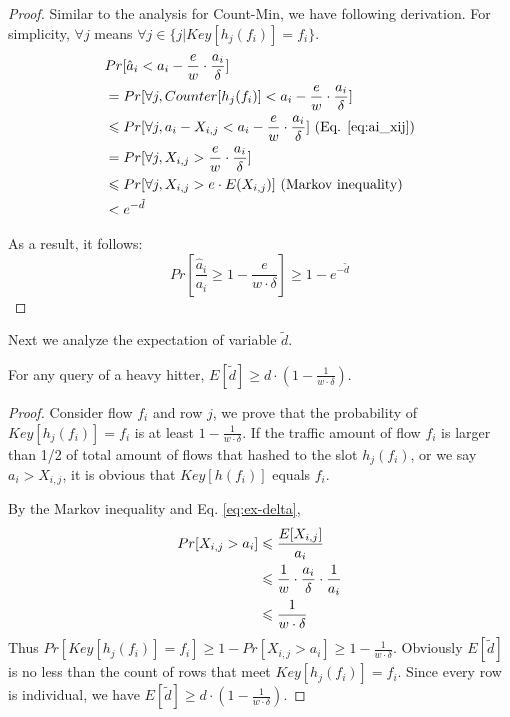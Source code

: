 \begin{proof}
	
Similar to the analysis for Count-Min\cite{cormode2004improved}, we have following derivation. For simplicity, $\forall j$ means $\forall j\in \{j|Key[h_j(f_i)] = f_i\}$.
\begin{align}\notag
&Pr[\hat{a}_i< a_i-\frac{e}{w}\cdot\frac{a_i}{\delta}]\\\notag
&=Pr[\forall j, Counter[h_j(f_i)]<a_i-\frac{e}{w}\cdot\frac{a_i}{\delta} ]\\\notag
&\le Pr[\forall j, a_i-X_{i,j} <a_i-\frac{e}{w}\cdot\frac{a_i}{\delta} ] \text{ (Eq. \eqref{eq:ai_xij})}\\\notag
&=Pr[\forall j, X_{i,j} > \frac{e}{w}\cdot\frac{a_i}{\delta} ]\\\notag
&\le Pr[\forall j, X_{i,j}>e\cdot E(X_{i,j})]\text{ (Markov inequality)}\\\notag
&<e^{-\tilde{d}}
\end{align}
	
As a result, it follows:
\begin{equation}
Pr[\frac{\hat{a}_i}{a_i} \ge 1-\frac{e}{w\cdot \delta}]\ge 1-e^{-\tilde{d}}
\end{equation}
\end{proof}


Next we analyze the expectation of variable $\tilde{d}$.

\begin{theorem}\label{tm:acc}
For any query of a heavy hitter, $E[\tilde{d}]\ge d\cdot(1-\frac{1}{w\cdot\delta})$.
\end{theorem}

\begin{proof}
Consider flow $f_i$ and row $j$, we prove that the probability of $Key[h_j(f_i)] = f_i$ is at least $1 - \frac{1}{w\cdot\delta}$. If the traffic amount of flow $f_i$ is larger than 1/2 of total amount of flows that hashed to the slot $h_j(f_i) $, or we say $a_i > X_{i,j}$, it is obvious that $Key[h(f_i)] $ equals $f_i$.

	By the Markov inequality and Eq. \eqref{eq:ex-delta},
	\begin{align}\notag
	Pr[X_{i,j}>a_i] &\le \frac{E[X_{i,j}]}{a_i}\\\notag
	&\le \frac{1}{w}\cdot\frac{a_i}{\delta}\cdot\frac{1}{a_i}\\
	&\le \frac{1}{w\cdot\delta}
	\end{align}
	Thus $Pr[Key[h_j(f_i)]=f_i]\ge 1- Pr[X_{i,j}>a_i] \ge 1-\frac{1}{w\cdot\delta}$. Obviously $E[\tilde{d}]$ is no less than the count of rows that meet $Key[h_j(f_i)]=f_i$. Since every row is individual, we have $E[\tilde{d}]\ge d\cdot(1-\frac{1}{w\cdot\delta})$.
\end{proof}

